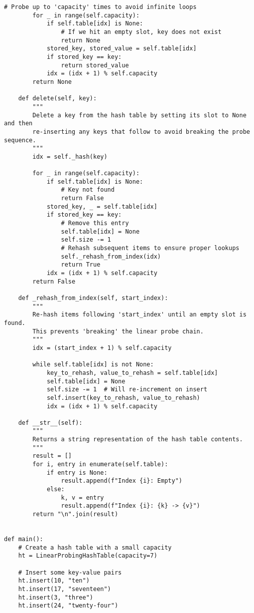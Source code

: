 \documentclass[a4paper,12pt]{article}
\begin{document}
\begin{lstlisting}[style=pythonstyle]
        # Probe up to 'capacity' times to avoid infinite loops
        for _ in range(self.capacity):
            if self.table[idx] is None:
                # If we hit an empty slot, key does not exist
                return None
            stored_key, stored_value = self.table[idx]
            if stored_key == key:
                return stored_value
            idx = (idx + 1) % self.capacity
        return None

    def delete(self, key):
        """
        Delete a key from the hash table by setting its slot to None and then
        re-inserting any keys that follow to avoid breaking the probe sequence.
        """
        idx = self._hash(key)

        for _ in range(self.capacity):
            if self.table[idx] is None:
                # Key not found
                return False
            stored_key, _ = self.table[idx]
            if stored_key == key:
                # Remove this entry
                self.table[idx] = None
                self.size -= 1
                # Rehash subsequent items to ensure proper lookups
                self._rehash_from_index(idx)
                return True
            idx = (idx + 1) % self.capacity
        return False

    def _rehash_from_index(self, start_index):
        """
        Re-hash items following 'start_index' until an empty slot is found.
        This prevents 'breaking' the linear probe chain.
        """
        idx = (start_index + 1) % self.capacity

        while self.table[idx] is not None:
            key_to_rehash, value_to_rehash = self.table[idx]
            self.table[idx] = None
            self.size -= 1  # Will re-increment on insert
            self.insert(key_to_rehash, value_to_rehash)
            idx = (idx + 1) % self.capacity

    def __str__(self):
        """
        Returns a string representation of the hash table contents.
        """
        result = []
        for i, entry in enumerate(self.table):
            if entry is None:
                result.append(f"Index {i}: Empty")
            else:
                k, v = entry
                result.append(f"Index {i}: {k} -> {v}")
        return "\n".join(result)


def main():
    # Create a hash table with a small capacity
    ht = LinearProbingHashTable(capacity=7)

    # Insert some key-value pairs
    ht.insert(10, "ten")
    ht.insert(17, "seventeen")
    ht.insert(3, "three")
    ht.insert(24, "twenty-four")


\end{lstlisting}
\end{document}
